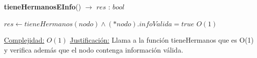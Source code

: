 \begin{algorithm}[H]{\textbf{tieneHermanosEInfo}() $\to$ $res$ : $bool$}
	\begin{algorithmic}
		\State $res \gets tieneHermanos(nodo) \land (*nodo).infoValida = true$ \Comment $O(1)$
		
		\medskip
		\Statex \underline{Complejidad:} $O(1)$
		\Statex \underline{Justificación:} Llama a la función tieneHermanos que es O(1) y verifica además que el nodo contenga información válida.

    \end{algorithmic}
\end{algorithm}
